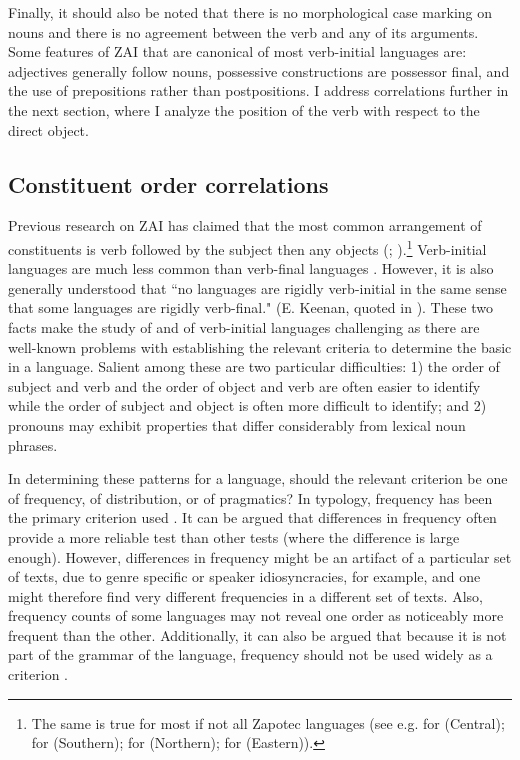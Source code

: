 Finally, it should also be noted that there is no morphological case marking on nouns and there is no agreement between the verb and any of its arguments. Some features of ZAI that are canonical of most verb-initial languages are: adjectives generally follow nouns, possessive constructions are possessor final, and the use of prepositions rather than postpositions. I address  correlations further in the next section, where I analyze the position of the verb with respect to the direct object.



\subsection{Constituent order correlations}\label{odercorrelationssection}

Previous research on ZAI has claimed that the most common arrangement of constituents is verb followed by the subject then any objects (\citealt{pickett1960}; \citealt{pickett1998}).\footnote{The same is true for most if not all Zapotec languages (see e.g. \citealt{lee2000} for  (Central); \citet{beamdeazcona2004} for  (Southern); \citet{sonnenschein2005} for  (Northern); \citet{sicoli2007} for   (Eastern)).} Verb-initial languages are much less common than verb-final languages \citep{payne1995}. However, it is also generally understood that ``no languages are rigidly verb-initial in the same sense that some languages are rigidly verb-final." (E. Keenan, quoted in \citet[455]{payne1995}). These two facts make the study of  and of verb-initial languages challenging as there are well-known problems with establishing the relevant criteria to determine the basic  in a language. Salient among these are two particular difficulties: 1) the order of subject and verb and the order of object and verb are often easier to identify while the order of subject and object is often more difficult to identify; and 2) pronouns may exhibit  properties that differ considerably from lexical noun phrases.

In determining these patterns for a language, should the relevant criterion be one of frequency, of distribution, or of pragmatics? In  typology, frequency has been the primary criterion used \citep{dryer2007}. It can be argued that differences in frequency often provide a more reliable test than other tests (where the difference is large enough). However, differences in frequency might be an artifact of a particular set of texts, due to genre specific or speaker idiosyncracies, for example, and one might therefore find very different frequencies in a different set of texts. Also, frequency counts of some languages may not reveal one order as noticeably more frequent than the other. Additionally, it can also be argued that because it is not part of the grammar of the language, frequency should not be used widely as a criterion \citep{dryer2007}.

